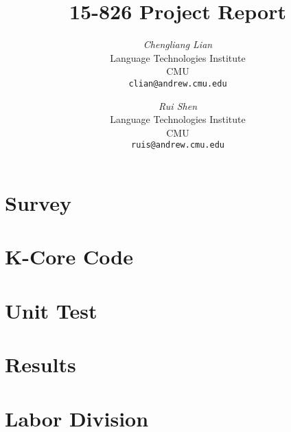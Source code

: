 \documentclass[12pt]{article}
\begin{document}
\newcommand{\beq}{\begin{equation}}
\newcommand{\eeq}{\end{equation}}
\newcommand{\bit}{\begin{itemize*}}
\newcommand{\eit}{\end{itemize*}}
\newcommand{\goal}[1]{ {\noindent {$\Rightarrow$} \em {#1} } }
\newcommand{\hide}[1]{}
\newcommand{\comment}[1]{ {\footnotesize {#1} } }
\newtheorem{lemma}{Lemma}
\newtheorem{theorem}{Theorem}
\newtheorem{proof}{Proof}
\newtheorem{defn}{Definition}
\newtheorem{algo}{Algorithm}
\newtheorem{observation}{Observation}

\title{15-826 Project Report}


\author{ {\em Chengliang Lian} \\
	    Language Technologies Institute \\
	    CMU\\
	    {\tt clian@andrew.cmu.edu}
	 \and
	 {\em Rui Shen} \\
	     Language Technologies Institute \\
	     CMU\\
	     {\tt ruis@andrew.cmu.edu}
	     }


\maketitle

\section{Survey}
    \label{sec:survey}
    

\section{K-Core Code}
    \label{sec:kcorecode}
    
    
\section{Unit Test}
    \label{sec:unittest}
    

\section{Results}
    \label{sec:results}
    

\section{Labor Division}
    \label{sec:labordivision}
    
    
\end{document}
